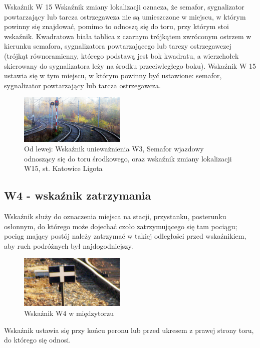 Wskaźnik W 15 {\textquotedbl}Wskaźnik zmiany lokalizacji{\textquotedbl} oznacza, że semafor, sygnalizator powtarzający
lub tarcza ostrzegawcza nie są umieszczone w miejscu, w którym powinny się znajdować, pomimo to odnoszą się do toru,
przy którym stoi wskaźnik. Kwadratowa biała tablica z czarnym trójkątem zwróconym ostrzem w kierunku semafora,
sygnalizatora powtarzającego lub tarczy ostrzegawczej (trójkąt równoramienny, którego podstawą jest bok kwadratu, a
wierzchołek skierowany do sygnalizatora leży na środku przeciwległego boku). Wskaźnik W 15 ustawia się w tym miejscu, w
którym powinny być ustawione: semafor, sygnalizator powtarzający lub tarcza ostrzegawcza.

	\begin{figure}
		\includegraphics[width=0.45\textwidth]{skryptkierownik-img/skryptkierownik-img005.jpg}
		\caption{Od lewej: Wskaźnik unieważnienia W3, Semafor wjazdowy odnoszący się do toru środkowego, oraz wskaźnik zmiany lokalizacji W15, st. Katowice Ligota}
	\end{figure}

\subsection{W4 - wskaźnik zatrzymania}

\begin{tcolorbox}[colback=black!5!white,colframe=white!55!black,title=Wskaźnik W4]Wskaźnik służy do oznaczenia miejsca na stacji, przystanku, posterunku osłonnym, do którego może dojechać czoło zatrzymującego się tam pociągu; pociąg mający postój należy zatrzymać w takiej odległości przed wskaźnikiem, aby ruch podróżnych był najdogodniejszy.
\end{tcolorbox}
	
\begin{figure}
	\includegraphics[width=0.45\textwidth]{skryptkierownik-img/skryptkierownik-img006.jpg}
	\caption{Wskaźnik W4 w międzytorzu}
\end{figure} 
Wskaźnik ustawia się przy końcu peronu lub przed ukresem z prawej strony toru, do którego się odnosi.

